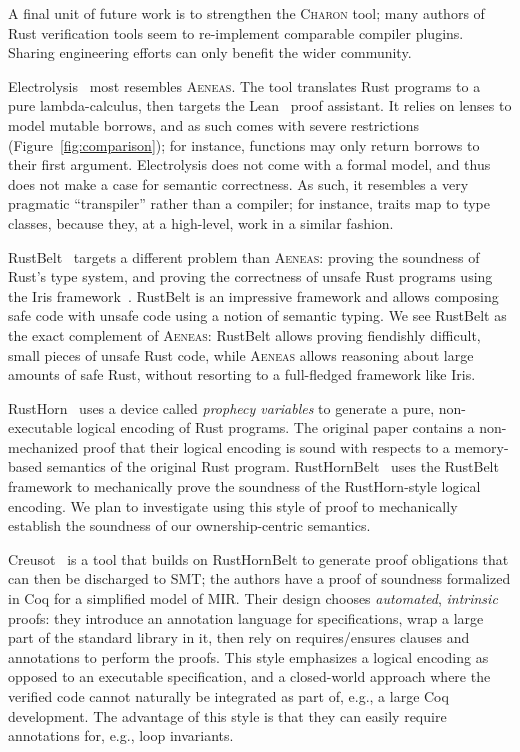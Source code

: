 \documentclass[acmsmall,screen]{acmart}
\newif\iflong
\newif\ifshort
\newcommand{\fref}[1]{Figure~\ref{fig:#1}}
\newcommand{\aeneas}{\textsc{Aeneas}\xspace}
\newcommand{\charon}{\textsc{Charon}\xspace}
\newcommand\myparagraph[1]{\emph{#1}.\ }
\let\myparagraph\paragraph
\begin{document}
\fi%
A final unit of future work is to strengthen the \charon tool; many authors of
Rust verification tools seem to re-implement comparable compiler plugins.
Sharing engineering efforts can only benefit the wider community.

\ifshort
\myparagraph{Related work}
\fi
\iflong
\section{Related work; conclusion}
\label{sec:conclusion}
\fi
Electrolysis~\cite{electrolysis} most resembles \aeneas. The tool translates
Rust programs to a pure lambda-calculus, then targets the
Lean~\cite{moura2015lean} proof assistant. It relies on lenses to model mutable
borrows, and as such comes with severe restrictions (\fref{comparison}); for
instance, functions may only return borrows to their first argument.
Electrolysis does not come with a formal model, and thus does not make
a case for semantic correctness. As such, it resembles a very pragmatic
``transpiler'' rather than a compiler; for instance, traits map to type classes,
because they, at a high-level, work in a similar fashion.


RustBelt~\cite{jung2017rustbelt} targets a different problem than \aeneas:
proving the soundness of Rust's type system, and proving the correctness of
unsafe Rust programs using the Iris framework~\cite{jung2018iris}. RustBelt is
an impressive framework and allows composing safe code with unsafe code using a
notion of semantic typing. We see RustBelt as the exact complement of \aeneas:
RustBelt allows proving fiendishly difficult, small pieces of unsafe Rust code,
while \aeneas allows reasoning about large amounts of safe Rust, without
resorting to a full-fledged framework like Iris.


RustHorn~\cite{matsushita2020rusthorn} uses a device called
\emph{prophecy variables} to generate a pure, non-executable logical encoding of
Rust programs. The original paper contains a non-mechanized proof that their
logical encoding is sound with respects to a memory-based semantics of the
original Rust program. RustHornBelt~\cite{RustHornBelt} uses the RustBelt
framework to mechanically prove the soundness of the RustHorn-style logical
encoding. We plan to investigate using this style of proof to mechanically
establish the soundness of our ownership-centric semantics.

Creusot~\cite{creusot} is a tool that builds on RustHornBelt to generate proof
obligations that can then be discharged to SMT; the authors
have a proof of soundness formalized in Coq for a simplified model of MIR.
Their design chooses \emph{automated},
\emph{intrinsic} proofs: they introduce an annotation language for specifications,
wrap a large part of the standard library in it, then rely on requires/ensures
clauses and annotations to perform the proofs. This style emphasizes a logical
encoding as opposed to an executable specification, and a closed-world approach
where the verified code cannot naturally be integrated as part of, e.g., a large
Coq development. The advantage of this style is that they can easily require
annotations for, e.g., loop invariants.
\end{document}
